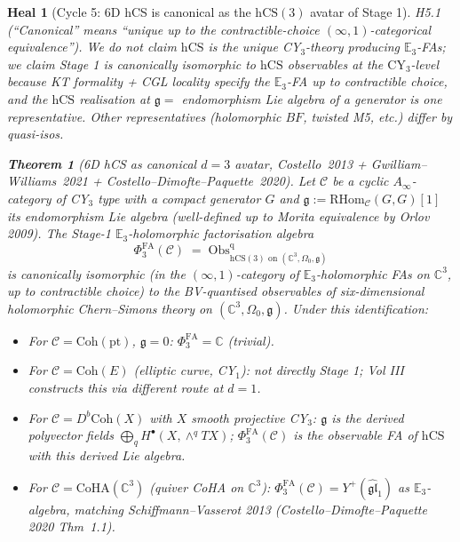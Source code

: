\documentclass[11pt]{article}
\newtheorem{theorem}{Theorem}
\newtheorem*{heal}{Heal}
\theoremstyle{definition}
\providecommand{\CC}{\mathbb{C}}
\providecommand{\fg}{\mathfrak{g}}
\providecommand{\cC}{\mathcal{C}}
\providecommand{\Obs}{\mathrm{Obs}}
\providecommand{\hCS}{\mathrm{hCS}}
\providecommand{\FA}{\mathrm{FA}}
\providecommand{\Coh}{\mathrm{Coh}}
\providecommand{\CoHA}{\mathrm{CoHA}}
\begin{document}
\begin{heal}[Cycle 5: 6D hCS is canonical as the $\hCS(3)$ avatar of Stage 1]

\emph{H5.1 (``Canonical'' means ``unique up to the contractible-choice
$(\infty,1)$-categorical equivalence'').} We do not claim $\hCS$ is
the unique CY$_3$-theory producing $\mathbb{E}_3$-FAs; we claim Stage 1 is
canonically isomorphic to $\hCS$ observables at the $\mathrm{CY}_3$-level
because KT formality + CGL locality specify the $\mathbb{E}_3$-FA
up to contractible choice, and the $\hCS$ realisation at $\fg = $
endomorphism Lie algebra of a generator is one representative. Other
representatives (holomorphic $BF$, twisted M5, etc.) differ by
quasi-isos.

\begin{theorem}[6D hCS as canonical $d=3$ avatar, Costello~2013 +
Gwilliam--Williams~2021 + Costello--Dimofte--Paquette~2020]
\label{thm:6dhcs-canonical-avatar}
Let $\cC$ be a cyclic $A_\infty$-category of CY$_3$ type with a
compact generator $G$ and $\fg := \mathrm{RHom}_\cC(G,G)[1]$ its
endomorphism Lie algebra (well-defined up to Morita equivalence by
Orlov 2009). The Stage-1 $\mathbb{E}_3$-holomorphic factorisation
algebra
\[
  \Phi^{\FA}_3(\cC) \;=\; \Obs^{\mathrm{q}}_{\hCS(3)\text{ on }(\CC^3,\Omega_0,\fg)}
\]
is canonically isomorphic (in the $(\infty,1)$-category of
$\mathbb{E}_3$-holomorphic FAs on $\CC^3$, up to contractible choice)
to the BV-quantised observables of six-dimensional holomorphic
Chern--Simons theory on $(\CC^3, \Omega_0, \fg)$. Under this
identification:
\begin{itemize}[leftmargin=2em]
  \item For $\cC = \Coh(\mathrm{pt})$, $\fg = 0$: $\Phi^{\FA}_3 = \CC$
        (trivial).
  \item For $\cC = \Coh(E)$ (elliptic curve, CY$_1$): not directly
        Stage 1; Vol III constructs this via different route at $d = 1$.
  \item For $\cC = D^b\Coh(X)$ with $X$ smooth projective CY$_3$:
        $\fg$ is the derived polyvector fields $\bigoplus_q
        H^{\bullet}(X,\wedge^q TX)$; $\Phi^{\FA}_3(\cC)$ is the
        observable FA of $\hCS$ with this derived Lie algebra.
  \item For $\cC = \CoHA(\CC^3)$ (quiver CoHA on $\CC^3$):
        $\Phi^{\FA}_3(\cC) = Y^+(\widehat{\mathfrak{gl}}_1)$ as
        $\mathbb{E}_3$-algebra, matching Schiffmann--Vasserot 2013
        (Costello--Dimofte--Paquette 2020 Thm~1.1).
\end{itemize}
\end{theorem}


\end{heal}
\end{document}
